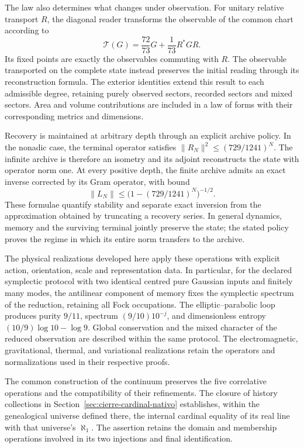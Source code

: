 The law also determines what changes under observation. For unitary relative transport \(R\), the diagonal reader transforms the observable of the common chart according to
\[
 \mathcal T(G)=\frac{72}{73}G+\frac1{73}R^*GR.
\]
Its fixed points are exactly the observables commuting with \(R\). The observable transported on the complete state instead preserves the initial reading through its reconstruction formula. The exterior identities extend this result to each admissible degree, retaining purely observed sectors, recorded sectors and mixed sectors. Area and volume contributions are included in a law of forms with their corresponding metrics and dimensions.

Recovery is maintained at arbitrary depth through an explicit archive policy. In the nonadic case, the terminal operator satisfies \(\|R_N\|^2\leq(729/1241)^N\). The infinite archive is therefore an isometry and its adjoint reconstructs the state with operator norm one. At every positive depth, the finite archive admits an exact inverse corrected by its Gram operator, with bound
\[
 \|L_N\|\leq\bigl(1-(729/1241)^N\bigr)^{-1/2}.
\]
These formulae quantify stability and separate exact inversion from the approximation obtained by truncating a recovery series. In general dynamics, memory and the surviving terminal jointly preserve the state; the stated policy proves the regime in which its entire norm transfers to the archive.

The physical realizations developed here apply these operations with explicit action, orientation, scale and representation data. In particular, for the declared symplectic protocol with two identical centred pure Gaussian inputs and finitely many modes, the antilinear component of memory fixes the symplectic spectrum of the reduction, retaining all Fock occupations. The elliptic--parabolic loop produces purity \(9/11\), spectrum \((9/10)10^{-j}\), and dimensionless entropy \((10/9)\log10-\log9\). Global conservation and the mixed character of the reduced observation are described within the same protocol. The electromagnetic, gravitational, thermal, and variational realizations retain the operators and normalizations used in their respective proofs.

The common construction of the continuum preserves the five correlative operations and the compatibility of their refinements. The closure of history collections in Section~\ref{sec:cierre-cardinal-nativo} establishes, within the genealogical universe defined there, the internal cardinal equality of its real line with that universe's \(\aleph_1\). The assertion retains the domain and membership operations involved in its two injections and final identification.

